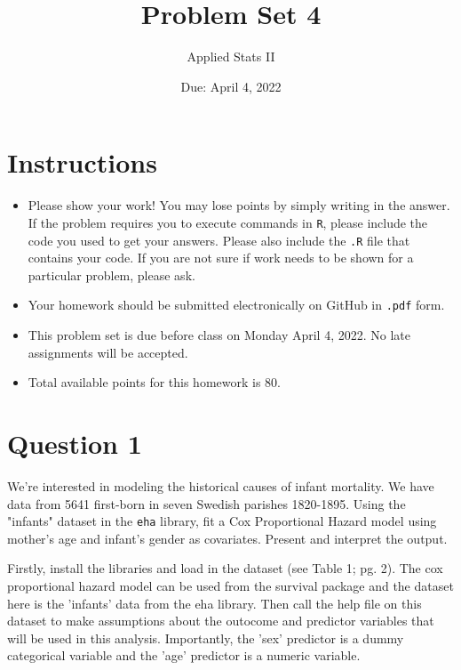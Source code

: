 \documentclass[12pt,letterpaper]{article}
\title{Problem Set 4}
\date{Due: April 4, 2022}
\author{Applied Stats II}
\begin{document}
	\maketitle
	\section*{Instructions}
	\begin{itemize}
		\item Please show your work! You may lose points by simply writing in the answer. If the problem requires you to execute commands in \texttt{R}, please include the code you used to get your answers. Please also include the \texttt{.R} file that contains your code. If you are not sure if work needs to be shown for a particular problem, please ask.
		\item Your homework should be submitted electronically on GitHub in \texttt{.pdf} form.
		\item This problem set is due before class on Monday April 4, 2022. No late assignments will be accepted.
		\item Total available points for this homework is 80.
	\end{itemize}

	\vspace{.25cm}
\section*{Question 1}
\vspace{.25cm}
\noindent We're interested in modeling the historical causes of infant mortality. We have data from 5641 first-born in seven Swedish parishes 1820-1895. Using the "infants" dataset in the \texttt{eha} library, fit a Cox Proportional Hazard model using mother's age and infant's gender as covariates. Present and interpret the output.

Firstly, install the libraries and load in the dataset (see Table 1; pg. 2). The cox proportional hazard model can be used from the survival package and the dataset here is the 'infants' data from the eha library. Then call the help file on this dataset to make assumptions about the outocome and predictor variables that will be used in this analysis.  Importantly, the 'sex' predictor is a dummy categorical variable and the 'age' predictor is a numeric variable. 
\end{document}

